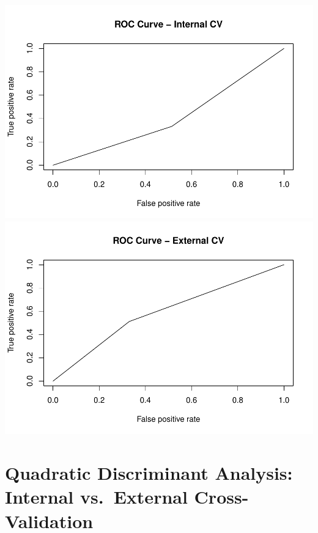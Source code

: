 \documentclass[american,]{article}
\begin{document}
\includegraphics{Final_Project_Applied_files/figure-latex/Quadratic Discrim AUC and ROC-1.pdf} \includegraphics{Final_Project_Applied_files/figure-latex/Quadratic Discrim AUC and ROC-2.pdf}

\hypertarget{quadratic-discriminant-analysis-internal-vs.-external-cross-validation}{%
\section{\texorpdfstring{\textbf{Quadratic Discriminant Analysis: Internal vs.~External Cross-Validation}}{Quadratic Discriminant Analysis: Internal vs.~External Cross-Validation}}\label{quadratic-discriminant-analysis-internal-vs.-external-cross-validation}}
\end{document}
